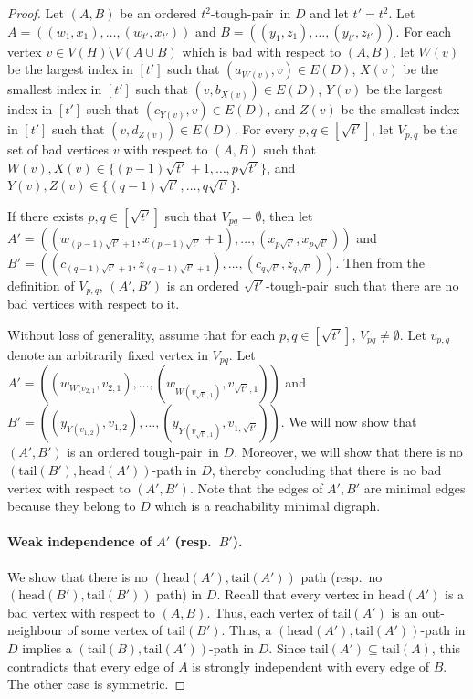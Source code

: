 \documentclass[a4paper,11pt]{article}
\theoremstyle{plain}
\newtheorem{identification rule}{Identification Rule}
\theoremstyle{definition}
\theoremstyle{remark}
\newcommand{\toughpair}{tough-pair}
\newcommand{\head}{\text{head}}
\newcommand{\tail}{\text{tail}}
\begin{document}
\begin{proof}
Let $(A,B)$ be an ordered $t^2$-\toughpair\ in $D$ and
let $t'=t^2$.
Let $A=((w_1,x_1), \ldots, (w_{t'},x_{t'}))$ and $B=((y_1,z_1), \ldots, (y_{t'},z_{t'}))$.
For each vertex $v \in V(H) \setminus V(A \cup B)$ which is bad with respect to $(A,B)$, let $W(v)$ be the largest index in $[t']$ such that $(a_{W(v)},v) \in E(D)$, $X(v)$ be the smallest index in $[t']$ such that $(v,b_{X(v)}) \in E(D)$, $Y(v)$ be the largest index in $[t']$ such that $(c_{Y(v)},v) \in E(D)$, and $Z(v)$ be the smallest index in $[t']$ such that $(v,d_{Z(v)}) \in E(D)$.
For every $p,q \in [\sqrt{t'}]$, let $V_{p,q}$ be the set of bad vertices $v$ with respect to $(A,B)$ such that
$W(v),X(v) \in \{(p-1)\sqrt{t'}+1, \ldots, p\sqrt{t'}\}$, and $Y(v),Z(v) \in \{(q-1)\sqrt{t'}, \ldots, q\sqrt{t'}\}$.

If there exists $p,q \in [\sqrt{t'}]$ such that $V_{pq}=\emptyset$, then let $A'=((w_{(p-1)\sqrt{t'}+1},x_{(p-1)\sqrt{t'}}+1), \ldots, (x_{p\sqrt{t'}}, x_{p\sqrt{t'}}))$ and 
$B'=((c_{(q-1)\sqrt{t'}+1},z_{(q-1)\sqrt{t'}+1}),\ldots, (c_{q\sqrt{t'}},z_{q\sqrt{t'}}))$. Then from the definition of $V_{p,q}$, $(A',B')$ is an ordered $\sqrt{t'}$-\toughpair\ such that there are no bad vertices with respect to it.

Without loss of generality, assume that for each $p,q \in [\sqrt{t'}]$, $V_{pq}\neq \emptyset$. Let $v_{p,q}$ denote an arbitrarily fixed vertex in $V_{pq}$. 
Let $A'=((w_{W(v_{2,1}}, v_{2,1}), \ldots, (w_{W(v_{\sqrt{t'},1})}, v_{\sqrt{t'},1}))$ and
 $B'=((y_{Y(v_{1,2})}, v_{1,2}),\ldots, (y_{Y(v_{\sqrt{t'},1})},v_{1,\sqrt{t'}} ))$. We will now show that $(A',B')$ is an ordered \toughpair\ in $D$. Moreover, we will show that there is no $(\tail(B'),\head(A'))$-path in $D$, thereby concluding that there is no bad vertex with respect to $(A',B')$. Note that the edges of $A',B'$ are minimal edges because they belong to $D$ which is a reachability minimal digraph.

\paragraph*{Weak independence of $A'$ (resp.~$B'$).}  We show that  there is no $(\head(A'),\tail(A'))$ path (resp.~no $(\head(B'),\tail(B'))$ path) in $D$. Recall that every vertex in $\head(A')$ is a bad vertex with respect to $(A,B)$.
Thus, each vertex of $\tail(A')$ is an out-neighbour of some vertex of $\tail(B')$. 
Thus, a $(\head(A'),\tail(A'))$-path in $D$ implies a $(\tail(B),\tail(A'))$-path in $D$. Since $\tail(A') \subseteq \tail(A)$, this contradicts that every edge of $A$ is strongly independent with every edge of $B$. 
The other case is symmetric.


\end{proof}
\end{document}
